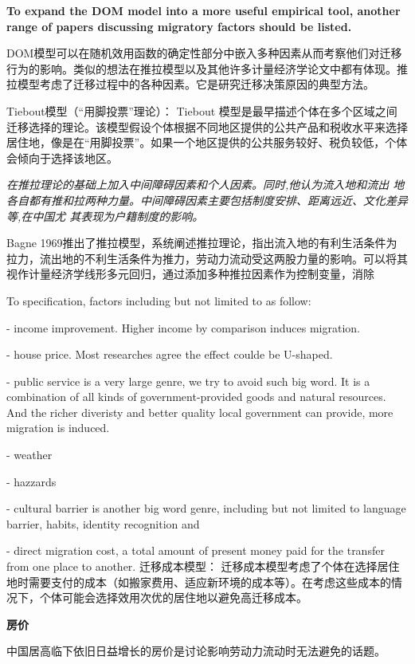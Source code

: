 \documentclass[a4paper,12pt,oneside]{book} %
\begin{document}
\textbf{To expand the DOM model into a more useful empirical tool, another range of papers discussing migratory factors should be listed.}

DOM模型可以在随机效用函数的确定性部分中嵌入多种因素从而考察他们对迁移行为的影响。类似的想法在推拉模型以及其他许多计量经济学论文中都有体现。推拉模型考虑了迁移过程中的各种因素。它是研究迁移决策原因的典型方法。

Tiebout模型（“用脚投票”理论）： Tiebout 模型是最早描述个体在多个区域之间迁移选择的理论。该模型假设个体根据不同地区提供的公共产品和税收水平来选择居住地，像是在“用脚投票”。如果一个地区提供的公共服务较好、税负较低，个体会倾向于选择该地区。

\cite{leeTheoryMigration1966}\textit{在推拉理论的基础上加入中间障碍因素和个人因素。同时,他认为流入地和流出  地各自都有推和拉两种力量。中间障碍因素主要包括制度安排、距离远近、文化差异等,在中国尤  其表现为户籍制度的影响。}

Bagne 1969推出了推拉模型，系统阐述推拉理论，指出流入地的有利生活条件为拉力，流出地的不利生活条件为推力，劳动力流动受这两股力量的影响。可以将其视作计量经济学线形多元回归，通过添加多种推拉因素作为控制变量，消除


To specification, factors including but not limited to as follow:

- income improvement. Higher income by comparison induces migration. 

- house price. Most researches agree the effect coulde be U-shaped.

- public service is a very large genre, we try to avoid such big word. It is a combination of all kinds of government-provided goods and natural resources. And the richer diveristy and better quality local government can provide, more migration is induced.

- weather

- hazzards

- cultural barrier is another big word genre, including but not limited to language barrier, habits, identity recognition and 

- direct migration cost, a total amount of present money paid for the transfer from one place to another. 迁移成本模型： 迁移成本模型考虑了个体在选择居住地时需要支付的成本（如搬家费用、适应新环境的成本等）。在考虑这些成本的情况下，个体可能会选择效用次优的居住地以避免高迁移成本。



\textbf{房价}

中国居高临下依旧日益增长的房价是讨论影响劳动力流动时无法避免的话题。
\end{document}

